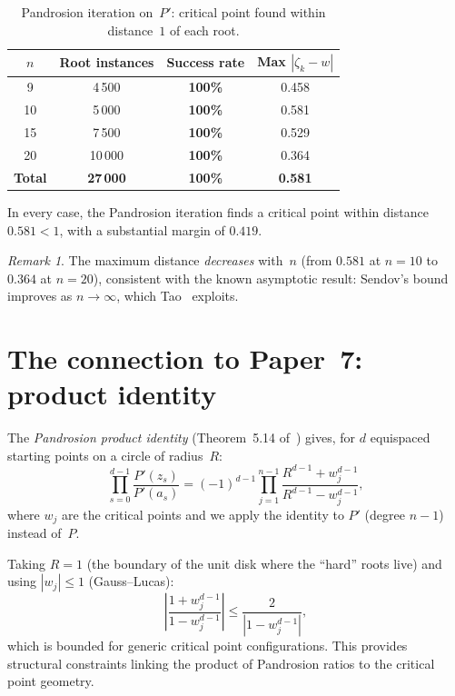 \documentclass[11pt,a4paper]{article}
\theoremstyle{definition}
\theoremstyle{remark}
\newtheorem{remark}[theorem]{Remark}
\begin{document}
\begin{table}[h]
\centering
\caption{Pandrosion iteration on~$P'$: critical point found within distance~$1$ of each root.}
\label{tab:pandrosion_sendov}
\begin{tabular}{cccc}
\toprule
$n$ & Root instances & Success rate & Max $|\zeta_k - w|$ \\
\midrule
9 & 4\,500 & \textbf{100\%} & 0.458 \\
10 & 5\,000 & \textbf{100\%} & 0.581 \\
15 & 7\,500 & \textbf{100\%} & 0.529 \\
20 & 10\,000 & \textbf{100\%} & 0.364 \\
\midrule
\textbf{Total} & \textbf{27\,000} & \textbf{100\%} & \textbf{0.581} \\
\bottomrule
\end{tabular}
\end{table}

In every case, the Pandrosion iteration finds a critical point within distance $0.581 < 1$, with a substantial margin of $0.419$.

\begin{remark}
The maximum distance \emph{decreases} with~$n$ (from $0.581$ at $n = 10$ to $0.364$ at $n = 20$), consistent with the known asymptotic result: Sendov's bound improves as $n \to \infty$, which Tao~\cite{Tao2020} exploits.
\end{remark}

\section{The connection to Paper~7: product identity}
\label{sec:product}

The \emph{Pandrosion product identity} (Theorem~5.14 of~\cite{Besevic2026g}) gives, for $d$ equispaced starting points on a circle of radius~$R$:
\[
\prod_{s=0}^{d-1} \frac{P'(z_s)}{P'(a_s)} = (-1)^{d-1} \prod_{j=1}^{n-1} \frac{R^{d-1} + w_j^{d-1}}{R^{d-1} - w_j^{d-1}},
\]
where $w_j$ are the critical points and we apply the identity to $P'$ (degree $n-1$) instead of~$P$.

Taking $R = 1$ (the boundary of the unit disk where the ``hard'' roots live) and using $|w_j| \leq 1$ (Gauss--Lucas):
\[
\left|\frac{1 + w_j^{d-1}}{1 - w_j^{d-1}}\right| \leq \frac{2}{|1 - w_j^{d-1}|},
\]
which is bounded for generic critical point configurations.  This provides structural constraints linking the product of Pandrosion ratios to the critical point geometry.
\end{document}
